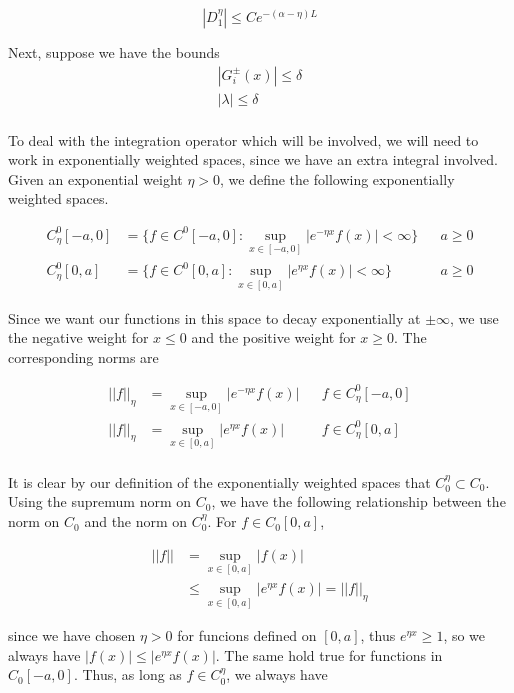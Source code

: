 \documentclass[12pt]{article}
\begin{document}
\[
|D_1^\eta| \leq C e^{-(\alpha - \eta)L}
\]

Next, suppose we have the bounds
\begin{align*}
|G_i^\pm(x)| \leq \delta \\
|\lambda| \leq \delta \\
\end{align*}

To deal with the integration operator which will be involved, we will need to work in exponentially weighted spaces, since we have an extra integral involved. Given an exponential weight $\eta > 0$, we define the following exponentially weighted spaces.

\begin{align*}
C^0_\eta[-a, 0] &= \{ f \in C^0[-a, 0] : \sup_{x \in [-a, 0]} |e^{-\eta x} f(x) | < \infty \} && a \geq 0 \\
C^0_\eta[0, a] &= \{ f \in C^0[0, a] : \sup_{x \in [0, a]} |e^{\eta x} f(x) | < \infty \} && a \geq 0 
\end{align*}

Since we want our functions in this space to decay exponentially at $\pm \infty$, we use the negative weight for $x \leq 0$ and the positive weight for $x \geq 0$. The corresponding norms are 

\begin{align*}
|| f ||_\eta &= \sup_{x \in [-a, 0]} |e^{-\eta x} f(x) | && f \in C^0_\eta[-a, 0] \\
|| f ||_\eta &= \sup_{x \in [0, a]} |e^{\eta x} f(x) | && f \in C^0_\eta[0, a] \\
\end{align*}

It is clear by our definition of the exponentially weighted spaces that $C_0^\eta \subset C_0$. Using the supremum norm on $C_0$, we have the following relationship between the norm on $C_0$ and the norm on $C_0^\eta$. For $f \in C_0[0, a]$,

\begin{align*}
|| f || &= \sup_{x \in [0,a]} | f(x) | \\
&\leq \sup_{x \in [0,a]} | e^{\eta x} f(x) | = ||f||_\eta
\end{align*}

since we have chosen $\eta > 0$ for funcions defined on $[0, a]$, thus $e^{\eta x} \geq 1$, so we always have $|f(x)| \leq  |e^{\eta x} f(x)|$. The same hold true for functions in $C_0[-a, 0]$. Thus, as long as $f \in C_0^\eta$, we always have
\end{document}

